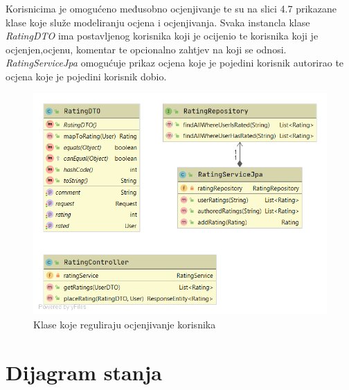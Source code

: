 				Korisnicima je omogućeno međusobno ocjenjivanje te su na slici 4.7 prikazane klase koje služe modeliranju ocjena i ocjenjivanja. Svaka instancla klase \textit{RatingDTO} ima postavljenog korisnika koji je ocijenio te korisnika koji je ocjenjen,ocjenu, komentar te opcionalno zahtjev na koji se odnosi.
				\textit{RatingServiceJpa} omogućuje prikaz ocjena koje je pojedini korisnik autorirao te ocjena koje je pojedini korisnik dobio.			
				\begin{figure}[H]
					\includegraphics[scale=0.6]{slike/cs5.png} %
					\centering
					\caption{Klase koje reguliraju ocjenjivanje korisnika}
					
				\end{figure}
				
				
			
				
			
			
				
		
			
			
			\eject
			
		\section{Dijagram stanja}


